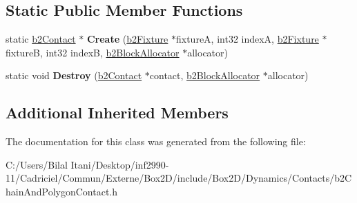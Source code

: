 \subsection*{Static Public Member Functions}
\begin{DoxyCompactItemize}
\item 
static \hyperlink{classb2_contact}{b2\+Contact} $\ast$ {\bfseries Create} (\hyperlink{classb2_fixture}{b2\+Fixture} $\ast$fixtureA, int32 indexA, \hyperlink{classb2_fixture}{b2\+Fixture} $\ast$fixtureB, int32 indexB, \hyperlink{classb2_block_allocator}{b2\+Block\+Allocator} $\ast$allocator)\hypertarget{classb2_chain_and_polygon_contact_aae40d48ef8f2a49297a38c615a79e3b2}{}\label{classb2_chain_and_polygon_contact_aae40d48ef8f2a49297a38c615a79e3b2}

\item 
static void {\bfseries Destroy} (\hyperlink{classb2_contact}{b2\+Contact} $\ast$contact, \hyperlink{classb2_block_allocator}{b2\+Block\+Allocator} $\ast$allocator)\hypertarget{classb2_chain_and_polygon_contact_aed8a69453a9d7bb77a3c2b70fb20c764}{}\label{classb2_chain_and_polygon_contact_aed8a69453a9d7bb77a3c2b70fb20c764}

\end{DoxyCompactItemize}
\subsection*{Additional Inherited Members}


The documentation for this class was generated from the following file\+:\begin{DoxyCompactItemize}
\item 
C\+:/\+Users/\+Bilal Itani/\+Desktop/inf2990-\/11/\+Cadriciel/\+Commun/\+Externe/\+Box2\+D/include/\+Box2\+D/\+Dynamics/\+Contacts/b2\+Chain\+And\+Polygon\+Contact.\+h\end{DoxyCompactItemize}
